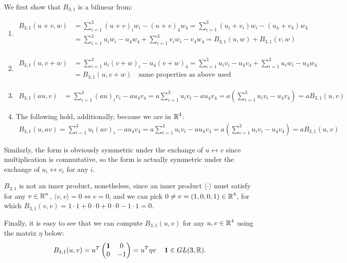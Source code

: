 \documentclass[11pt,onecolumn]{article}
\newcommand{\bl}{B_{3,1}}
\begin{document}
\begin{answer}
We first show that $\bl$ is a bilinear from:
\begin{enumerate}
    \item 
    \begin{align*}
        \bl(u+v,w) &= \sum_{i=1}^3 (u+v)_iw_i -(u+v)_4w_4 = \sum_{i=1}^3(u_i+v_i)w_i - (u_4+v_4)w_4 \\ &= \sum_{i=1}^3 u_iw_i - u_4w_4 + \sum_{i=1}^3 v_iw_i - v_4w_4 = \bl(u,w) + \bl(v,w) \\
    \end{align*}
    \item \vspace{-.7cm}
    \begin{align*}
        \bl(u,v+w) &= \sum_{i=1}^3 u_i(v+w)_i - u_4(v+w)_4 = \sum_{i=1}^3 u_iv_i - u_4v_4 + \sum_{i=1}^3 u_iw_i - u_4w_4 \\ 
        &= \bl(u,v+w) \quad \text{same properties as above used}
    \end{align*}
    \item\vspace{-.7cm}
    \begin{align*}
        \bl(au,v) &= \sum_{i=1}^3 (au)_iv_i - au_4v_4 = a\sum_{i=1}^3u_iv_i - au_4v_4 = a (\sum_{i=1}^3 u_iv_i - u_4v_4) = a\bl(u,v)
    \end{align*} 
    \item The following hold, additionally, because we are in $\operatorname{\mathbb{R}}^4$:
    \begin{align*}
        \bl(u,av) = \sum_{i=1}^3 u_i(av)_i - au_4v_4 = a\sum_{i=1}^3u_iv_i - au_4v_4 = a (\sum_{i=1}^3 u_iv_i - u_4v_4) = a\bl(u,v)
    \end{align*}
\end{enumerate}
Similarly, the form is obviously symmetric under the exchange of $u \leftrightarrow v$ since multiplication is commutative, so the form is actually symmetric under the exchange of $u_i \leftrightarrow v_i$ for any $i$.

$\bl$ is not an inner product, nonetheless, since an inner product $\langle \cdot \rangle$ must satisfy for any $v \in \operatorname{\mathbb{R}}^n$, $\langle v,v \rangle = 0 \Leftrightarrow v=0$, and we can pick $0 \neq v=(1,0,0,1) \in \operatorname{\mathbb{R}}^4$, for which $\bl(v,v) = 1\cdot 1 + 0 \cdot 0+ 0 \cdot 0 - 1 \cdot 1 = 0$.

Finally, it is easy to see that we can compute $\bl(u,v)$ for any $u,v \in \operatorname{\mathbb{R}}^4$ using the matrix $\eta$ below:
$$ \bl(u,v) = u^T \begin{pmatrix} \one & 0 \\ 0 & -1 \end{pmatrix} = u^T\eta v \quad \one \in GL(3,\real).$$


\end{answer}
\end{document}
